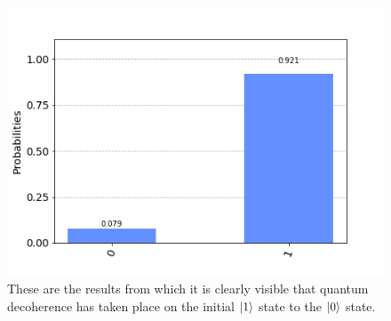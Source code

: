 \begin{figure}[h]
	\centering
	\includegraphics[scale = 0.75]{../Demonstration/img/Quantum_decoherence_graph.PNG}
	\caption{These are the results from which it is clearly visible that quantum decoherence has taken place on the initial $\ket{1}$ state to the $\ket{0}$ state.}
\end{figure}






